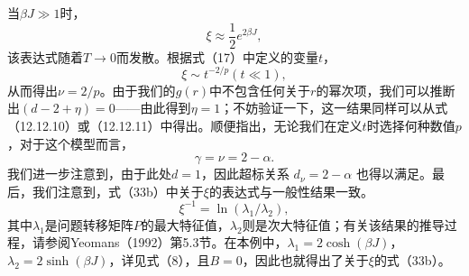 当\(\beta J \gg 1\)时，
\begin{equation}\tag{13.1.48}\label{eq:13.1.48}
\xi \approx \frac { 1 } { 2 } e ^{2 \beta J} ,
\end{equation}
该表达式随着\(T \to 0\)而发散。根据式（17）中定义的变量\(t\)，
\begin{equation}\tag{13.1.49}\label{eq:13.1.49}
\xi \sim t ^{- 2 / p}  ( t \ll 1 ) ,
\end{equation}
从而得出\(\nu=2/p\)。由于我们的\(g(r)\)中不包含任何关于\(r\)的幂次项，我们可以推断出\((d-2+\eta)=0\)——由此得到\(\eta=1\)；不妨验证一下，这一结果同样可以从式（12.12.10）或（12.12.11）中得出。顺便指出，无论我们在定义\(t\)时选择何种数值\(p\)，对于这个模型而言，
\begin{equation}\tag{13.1.50}\label{eq:13.1.50}
\gamma = \nu = 2 - \alpha .
\end{equation}
我们进一步注意到，由于此处\(d=1\)，因此超标关系 \(d_{\nu}=2-\alpha\) 也得以满足。最后，我们注意到，式（33b）中关于\(\xi\)的表达式与一般性结果一致。
\begin{equation}\tag{13.1.51}\label{eq:13.1.51}
\xi ^{- 1} = \ln ( \lambda _ { 1 } / \lambda _ { 2 } ) ,
\end{equation}
其中\(\lambda_{1}\)是问题转移矩阵\(P\)的最大特征值，\(\lambda_{2}\)则是次大特征值；有关该结果的推导过程，请参阅Yeomans（1992）第5.3节。在本例中，\(\lambda_{1}=2\cosh(\beta J)\)，\(\lambda_{2}=2\sinh(\beta J)\)，详见式（8），且\(B=0\)，因此也就得出了关于\(\xi\)的式（33b）。
